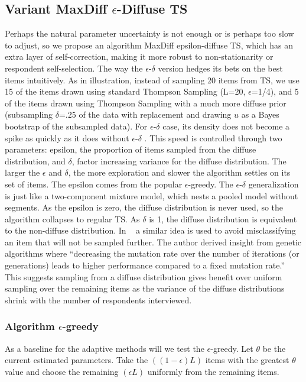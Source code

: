 \documentclass[nonblindrev]{informs3}
\begin{document}
\subsection{Variant MaxDiff $\epsilon$-Diffuse TS}
Perhaps the natural parameter uncertainty is not enough or is perhaps too slow to adjust, so we propose an algorithm MaxDiff epsilon-diffuse TS, which has an extra layer of self-correction, making it more robust to non-stationarity or respondent self-selection. 
The way the $\epsilon$-$\delta$ version hedges its bets on the best items intuitively. As in illustration, instead of sampling 20 items from TS, we use 15 of the items drawn using standard Thompson Sampling (L=20, $\epsilon$=1/4), and 5 of the items drawn using Thompson Sampling with a much more diffuse prior (subsampling $\delta$=.25 of the data with replacement and drawing $u$ as a Bayes bootstrap of the subsampled data).
For $\epsilon$-$\delta$ case, its density does not become a spike as quickly as it does without $\epsilon$-$\delta$ . This speed is controlled through two parameters: epsilon, the proportion of items sampled from the diffuse distribution, and $\delta$, factor increasing variance for the diffuse distribution.  The larger the $\epsilon$ and $\delta$, the more exploration and slower the algorithm settles on its set of items. The epsilon comes from the popular $\epsilon$-greedy.
The $\epsilon$-$\delta$  generalization is just like a two-component mixture model, which nests a pooled model without segments. As the epsilon is zero, the diffuse distribution is never used, so the algorithm collapses to regular TS. As $\delta$ is 1, the diffuse distribution is equivalent to the non-diffuse distribution.
In ~\cite{toubia2007adaptive} a similar idea is used to avoid misclassifying an item that will not be sampled further. The author derived insight from genetic algorithms where ``decreasing the mutation rate over the number of iterations (or generations) leads to higher performance compared to a fixed mutation rate.'' This suggests sampling from a diffuse distribution gives benefit over uniform sampling over the remaining items as the variance of the diffuse distributions shrink with the number of respondents interviewed.



\subsubsection{Algorithm $\epsilon$-greedy}
As a baseline for the adaptive methods will we test the $\epsilon$-greedy.
Let $\theta$ be the current estimated parameters. Take the $((1-\epsilon)L)$ items with the greatest $\theta$ value and choose the remaining $(\epsilon L)$ uniformly from the remaining items.
\end{document}
